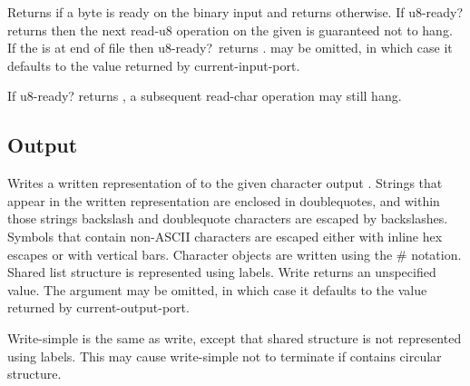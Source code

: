 \begin{entry}{%
}

Returns \schtrue{} if a byte is ready on the binary input 
and returns \schfalse{} otherwise.  If {\cf u8-ready?} returns
\schtrue{} then the next {\cf read-u8} operation on the given
 is guaranteed not to hang.  If the  is at end of
file then {\cf u8-ready?}\ returns \schtrue.   may be
omitted, in which case it defaults to the value returned by {\cf
  current-input-port}.

\begin{note}
If {\cf u8-ready?} returns \schtrue{}, a subsequent {\cf read-char}
operation may still hang.
\end{note}
\end{entry}

\subsection{Output}
\label{outputsection}

\noindent \hbox{}
\vspace{-5ex}

\begin{entry}{%
}

Writes a written representation of  to the given character output
.  Strings
that appear in the written representation are enclosed in doublequotes, and
within those strings backslash and doublequote characters are
escaped by backslashes.  Symbols that contain non-ASCII characters
are escaped either with inline hex escapes or with vertical bars.
Character objects are written using the {\cf \#\backwhack} notation.
Shared list structure is represented using labels.
{\cf Write} returns an unspecified value.  The
 argument may be omitted, in which case it defaults to the value
returned by {\cf current-output-port}.

\end{entry}

\begin{entry}{%
}

{\cf Write-simple} is the same as {\cf write}, except that shared structure is
not represented using labels.  This may cause {\cf write-simple} not to
terminate if  contains circular structure.

\end{entry}


